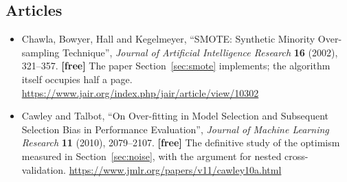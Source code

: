 \documentclass[11pt]{article}
\begin{document}
\subsection*{Articles}

\begin{itemize}[leftmargin=*]
  \item Chawla, Bowyer, Hall and Kegelmeyer, ``SMOTE: Synthetic Minority
    Over-sampling Technique'', \emph{Journal of Artificial Intelligence
    Research} \textbf{16} (2002), 321--357. \textbf{[free]} The paper
    Section~\ref{sec:smote} implements; the algorithm itself occupies half a
    page. \url{https://www.jair.org/index.php/jair/article/view/10302}
  \item Cawley and Talbot, ``On Over-fitting in Model Selection and Subsequent
    Selection Bias in Performance Evaluation'', \emph{Journal of Machine
    Learning Research} \textbf{11} (2010), 2079--2107. \textbf{[free]} The
    definitive study of the optimism measured in Section~\ref{sec:noise}, with
    the argument for nested cross-validation.
    \url{https://www.jmlr.org/papers/v11/cawley10a.html}
\end{itemize}

\enlargethispage{4\baselineskip}
\notesources{\AMLUnitIVSources}
\end{document}
